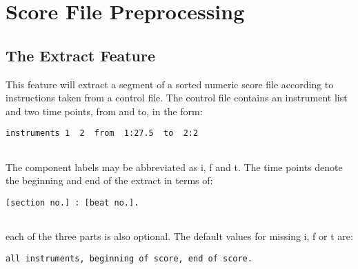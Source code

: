 \begin{comment}
\documentclass[10pt]{article}
\usepackage{fullpage, graphicx, url}
\setlength{\parskip}{1ex}
\setlength{\parindent}{0ex}
\title{Score File Preprocessing}



\begin{tabular}{ccc}
The Alternative Csound Reference Manual & & \\
Previous &The Csound Command &Next

\end{tabular}

\end{comment}
\section{Score File Preprocessing}
\subsection*{The Extract Feature}


  This feature will extract a segment of a sorted numeric score file according to instructions taken from a control file. The control file contains an instrument list and two time points, from and to, in the form: 


 
\begin{lstlisting}
instruments 1  2  from  1:27.5  to  2:2
        
\end{lstlisting}


 


  The component labels may be abbreviated as i, f and t. The time points denote the beginning and end of the extract in terms of: 


 
\begin{lstlisting}
[section no.] : [beat no.].
        
\end{lstlisting}


 


  each of the three parts is also optional. The default values for missing i, f or t are: 


 
\begin{lstlisting}
all instruments, beginning of score, end of score.
        
\end{lstlisting}


